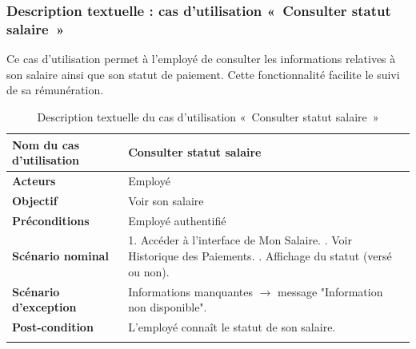 \subsubsection*{Description textuelle : cas d'utilisation «~Consulter  statut salaire~»}
Ce cas d'utilisation permet à l'employé de consulter les informations relatives à son salaire ainsi que son statut de paiement. Cette fonctionnalité facilite le suivi de sa rémunération.
\begin{center}
\begin{longtable}{|p{5cm}|p{9cm}|}
\hline
\textbf{Nom du cas d'utilisation} & Consulter  statut salaire \\ \hline
\textbf{Acteurs} & Employé \\ \hline
\textbf{Objectif} & Voir son  salaire \\ \hline
\textbf{Préconditions} & Employé authentifié \\ \hline
\textbf{Scénario nominal} &
1. Accéder à l'interface de Mon Salaire. \newline
2. Voir Historique des Paiements. \newline
3. Affichage du statut (versé ou non). \\ \hline
\textbf{Scénario d'exception} & Informations manquantes $\rightarrow$ message "Information non disponible". \\ \hline
\textbf{Post-condition} & L'employé connaît le statut de son salaire. \\ \hline
\caption{Description textuelle du cas d'utilisation «~Consulter statut  salaire~»}
\end{longtable}
\end{center}

